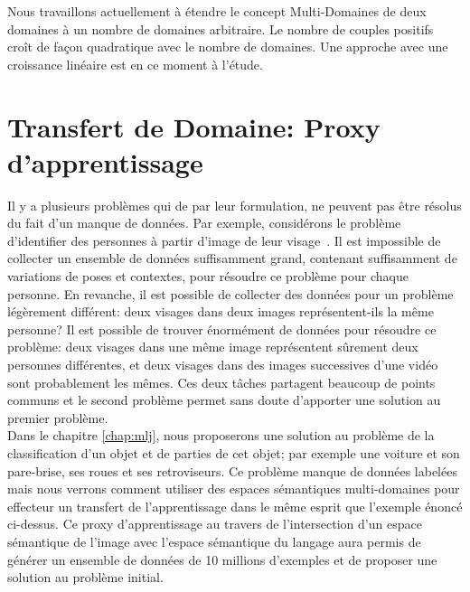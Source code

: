 Nous travaillons actuellement à étendre le concept Multi-Domaines de deux
domaines à un nombre de domaines arbitraire. Le nombre de couples positifs
croît de façon quadratique avec le nombre de domaines. Une approche avec
une croissance linéaire est en ce moment à l'étude.

\section{Transfert de Domaine: Proxy d'apprentissage}

Il y a plusieurs problèmes qui de par leur formulation, ne peuvent pas être
résolus du fait d'un manque de données. Par exemple, considérons le problème
d'identifier des personnes à partir d'image de leur visage~\citep{bottou-11}.
Il est impossible de collecter un ensemble de données suffisamment grand,
contenant suffisamment de variations de poses et contextes, pour résoudre ce
problème pour chaque personne. En revanche, il est possible de collecter des
données pour un problème légèrement différent: deux visages dans deux images
représentent-ils la même personne? Il est possible de trouver énormément de
données pour résoudre ce problème: deux visages dans une même image
représentent sûrement deux personnes différentes, et deux visages dans des
images successives d'une vidéo sont probablement les mêmes. Ces deux tâches
partagent beaucoup de points communs et le second problème permet sans doute
d'apporter une solution au premier problème. 
\\

Dans le chapitre \ref{chap:mlj}, nous proposerons une solution au problème de
la classification d'un objet et de parties de cet objet; par exemple une
voiture et son pare-brise, ses roues et ses retroviseurs. Ce problème manque de
données labelées mais nous verrons comment utiliser des espaces sémantiques
multi-domaines pour effecteur un transfert de l'apprentissage dans le même
esprit que l'exemple énoncé ci-dessus. Ce proxy d'apprentissage au travers de
l'intersection d'un espace sémantique de l'image avec l'espace sémantique du
langage aura permis de générer un ensemble de données de 10 millions d'exemples
et de proposer une solution au problème initial.

